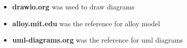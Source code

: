 
\clearpage
{}
\label{sect:effort}



\clearpage
{}


\begin{itemize}
	\item \textbf{drawio.org} was used to draw diagrams
	\item \textbf{alloy.mit.edu} was the reference for alloy model
	\item \textbf{uml-diagrams.org} was the reference for uml diagrams
\end{itemize}





